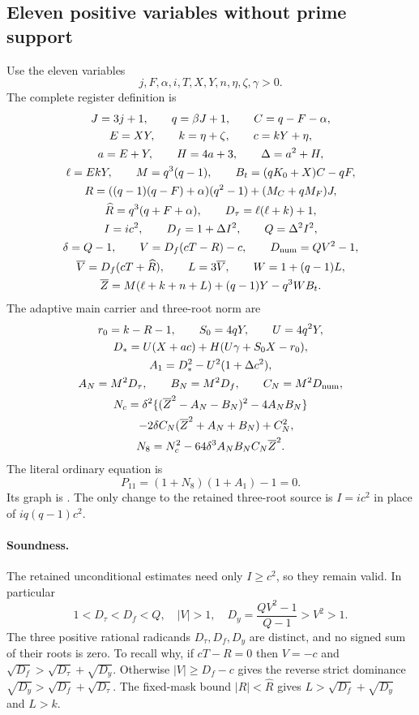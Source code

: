 \subsection{Eleven positive variables without prime support}
Use the eleven variables
\[
 j,F,\alpha,i,T,X,Y,n,\eta,\zeta,\gamma>0.
\]
The complete register definition is
\begin{gather*}
 J=3j+1,\qquad q=\beta J+1,\qquad C=q-F-\alpha,\\
 E=XY,\qquad k=\eta+\zeta,\qquad c=kY+\eta,\\
 a=E+Y,\qquad H=4a+3,\qquad \Delta=a^2+H,\\
 \ell=EkY,\qquad M=q^3(q-1),\qquad B_t=(qK_0+X)C-qF,\\
 R=((q-1)(q-F)+\alpha)(q^2-1)+(M_C+qM_F)J,\\
 \widehat R=q^3(q+F+\alpha),\qquad D_\tau=\ell(\ell+k)+1,\\
 I=ic^2,\qquad D_f=1+\Delta I^2,\qquad Q=\Delta^2I^2,\\
 \delta=Q-1,\qquad V=D_f(cT-R)-c,\qquad D_{\rm num}=QV^2-1,\\
 \overline V=D_f(cT+\widehat R),\qquad L=3\overline V,\qquad W=1+(q-1)L,\\
 \overline Z=M(\ell+k+n+L)+(q-1)Y-q^3WB_t.
\end{gather*}
The adaptive main carrier and three-root norm are
\begin{gather*}
 r_0=k-R-1,\qquad S_0=4qY,\qquad U=4q^2Y,\\
 D_*=U(X+ac)+H(U\gamma+S_0X-r_0),\\
 A_1=D_*^2-U^2(1+\Delta c^2),\\
 A_N=M^2D_\tau,\qquad B_N=M^2D_f,\qquad C_N=M^2D_{\rm num},\\
 N_c=\delta^2\{(\overline Z^2-A_N-B_N)^2-4A_NB_N\}\\
 \hspace{1em}-2\delta C_N(\overline Z^2+A_N+B_N)+C_N^2,\\
 N_8=N_c^2-64\delta^3A_NB_NC_N\overline Z^2.
\end{gather*}
The literal ordinary equation is
\begin{equation}\label{eq:positive11}
 P_{11}=(1+N_8)(1+A_1)-1=0.
\end{equation}
Its graph is . The only change to the
retained three-root source is $I=ic^2$ in place of $iq(q-1)c^2$.

\paragraph{Soundness.}
The retained unconditional estimates need only $I\ge c^2$, so they
remain valid. In particular
\[
 1<D_\tau<D_f<Q,\quad |V|>1,\quad
 D_y=\frac{QV^2-1}{Q-1}>V^2>1.
\]
The three positive rational radicands $D_\tau,D_f,D_y$ are distinct,
and no signed sum of their roots is zero. To recall why, if $cT-R=0$
then $V=-c$ and $\sqrt{D_f}>\sqrt{D_\tau}+\sqrt{D_y}$.
Otherwise $|V|\ge D_f-c$ gives the reverse strict dominance
$\sqrt{D_y}>\sqrt{D_f}+\sqrt{D_\tau}$. The fixed-mask bound
$|R|<\widehat R$ gives $L>\sqrt{D_f}+\sqrt{D_y}$ and $L>k$.

